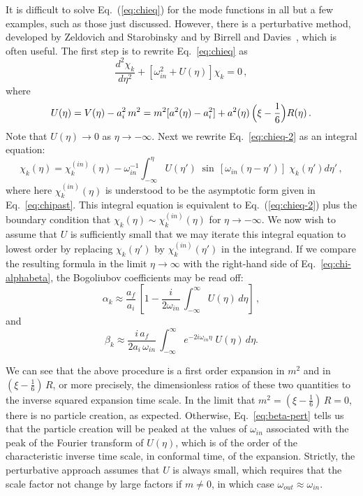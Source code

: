 \documentclass[12pt,onecolumn,eqsecnum,floats,aps,prd,floatfix,titlepage,tightenlines]{revtex4-2}
\begin{document}
 
   It is difficult to solve Eq.~(\ref{eq:chieq}) for the mode 
functions in all but a few examples, such as those just discussed. However, there is a perturbative
method, developed by Zeldovich and Starobinsky \cite{ZS} and by Birrell and
Davies~\cite{BD2}, which is often useful. The first step is to rewrite Eq.~\eqref{eq:chieq}
as
\begin{equation}
{\frac{d^2\chi_k}{d\eta^2}} + [ \omega_{in}^2 + U(\eta) ]\chi_{k} =0 \, ,
                                                 \label{eq:chieq-2}
\end{equation}
where
\begin{equation}
U(\eta) =V(\eta)-a_i^2\, m^2 = m^2[a^2(\eta) -a_i^2] 
        +a^2(\eta)\, \Bigl( \xi - \frac{1}{6}\Bigr) R(\eta)\,.
        \label{eq:U}
\end{equation}
Note that $U(\eta) \rightarrow 0$ as $\eta \rightarrow -\infty$.
Next we rewrite Eq.~\eqref{eq:chieq-2} as an integral equation:
\begin{equation}
\chi_k(\eta) = \chi_k^{(in)}(\eta) - \omega_{in}^{-1} \int_{-\infty}^\eta
             U(\eta')\;\sin \, [\omega_{in}(\eta-\eta')]\;\chi_k(\eta') d\eta' \,,
\end{equation}
where here  $\chi_k^{(in)}(\eta)$ is understood to be the asymptotic form given in Eq.~\eqref{eq:chipast}.
This integral equation is equivalent to Eq.~(\ref{eq:chieq-2}) 
plus the boundary condition that $\chi_k(\eta) \sim \chi_k^{(in)}(\eta)$
for $\eta \rightarrow -\infty$.
We now wish to assume that $U$ is sufficiently small that we
may iterate this integral equation to lowest order by replacing
$\chi_k(\eta')$ by $\chi_k^{(in)}(\eta')$ in the integrand. If we
compare the resulting formula in the limit $\eta \rightarrow \infty$  with 
the right-hand side of Eq.~\eqref{eq:chi-alphabeta},  
the Bogoliubov coefficients may be read off:
\begin{equation}
\alpha_k \approx   \frac{a_f}{a_i}\,  \left[1 - \frac{i}{2\omega_{in}} \, \int_{-\infty}^\infty
             U(\eta)\, d\eta \right]\,,
\end{equation}
and
\begin{equation}
\beta_k \approx    \frac{i\, a_f}{2  a_i\, \omega_{in}} \,  \int_{-\infty}^\infty
            e^{-2i\omega_{in} \eta}\; U(\eta)\, d\eta.     \label{eq:beta-pert}
\end{equation}
 
 We can see that the above procedure is a first order expansion in $m^2$ and in
 $( \xi - \frac{1}{6})\, R$, or more precisely, the dimensionless ratios of these two quantities to
 the inverse squared expansion time scale. In the limit that $m^2 = ( \xi - \frac{1}{6})\, R =0$, there is no particle
 creation, as expected. Otherwise, Eq.~\eqref{eq:beta-pert} tells us that the particle creation will be peaked
 at the values of $\omega_{in}$ associated with the peak of the Fourier transform of $U(\eta)$, which is of the 
 order of the characteristic inverse  time scale, in conformal time, of the expansion. Strictly, the perturbative
 approach assumes that $U$ is always small, which requires that the scale factor not change by large factors
 if $m \not=0$, in which case $\omega_{out} \approx \omega_{in}$. 
 
\end{document}

